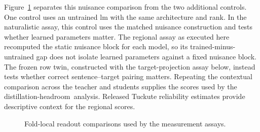 Figure~\ref{fig:measurement-readouts} separates this nuisance comparison from the two additional controls.
One control uses an untrained \ac{lm} with the same architecture and rank.
In the naturalistic assay, this control uses the matched nuisance construction and tests whether learned parameters matter.
The regional assay as executed here recomputed the static nuisance block for each model, so its trained-minus-untrained gap does not isolate learned parameters against a fixed nuisance block.
The frozen row twin, constructed with the target-projection assay below, instead tests whether correct sentence--target pairing matters.
Repeating the contextual comparison across the teacher and students supplies the scores used by the distillation-headroom~analysis.
Released Tuckute reliability estimates provide descriptive context for the regional scores.

\begin{figure}[tbp]
  \centering
  \resizebox{\textwidth}{!}{}
  \caption{Fold-local readout comparisons used by the measurement assays.}
  \label{fig:measurement-readouts}
\end{figure}

